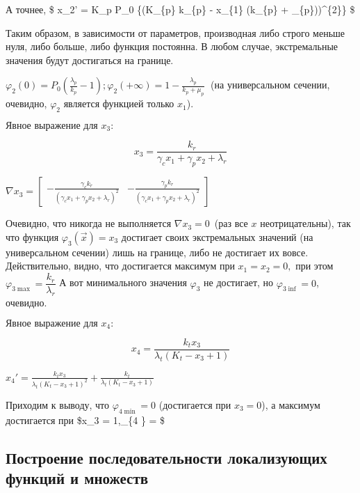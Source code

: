 \documentclass[11pt]{article}
\begin{document}
    
    А точнее, \$ x\_2' = K\_p P\_0
 \{\left(K\_\{p\}
k\_\{p\} - x\_\{1\} \left(k\_\{p\} + \mu\_\{p\}\right)\right)\^{}\{2\}\}
\$

Таким образом, в зависимости от параметров, производная либо строго
меньше нуля, либо больше, либо функция постоянна. В любом случае,
экстремальные значения будут достигаться на границе.

\(\varphi_2(0) = P_0 \left( \frac{\lambda_p}{k_p} - 1\right);  \varphi_2(+\!\infty) = 1 - \frac{\lambda_p}{k_p + \mu_p}\;\)
(на универсальном сечении, очевидно, \(\varphi_2\) является функцией
только \(x_1\)).

    $ \text{Явное выражение для } x_3: $

    
    $$ x_3 = \frac{k_{r}}{\gamma_{c} x_{1} + \gamma_{p} x_{2} + \lambda_{r}}$$

    
    $\nabla x_3 = \left[\begin{matrix}- \frac{\gamma_{c} k_{r}}{\left(\gamma_{c} x_{1} + \gamma_{p} x_{2} + \lambda_{r}\right)^{2}} & - \frac{\gamma_{p} k_{r}}{\left(\gamma_{c} x_{1} + \gamma_{p} x_{2} + \lambda_{r}\right)^{2}}\end{matrix}\right] $

    
    Очевидно, что никогда не выполняется \(\nabla x_3 = 0\,\) (раз все \(x\)
неотрицательны), так что функция \(\varphi_3(\vec{x}) = x_3\) достигает
своих экстремальных значений (на универсальном сечении) лишь на границе,
либо не достигает их вовсе. Действительно, видно, что достигается
максимум при \(x_1 = x_2 = 0,\) при этом
\(\varphi_{3 \max} = \dfrac{k_r}{\lambda_r}\) А вот минимального
значения \(\varphi_3\) не достигает, но \(\varphi_{3 \inf} = 0\),
очевидно.

    $ \text{Явное выражение для } x_4: $

    
    $$ x_4 = \frac{k_{t} x_{3}}{\lambda_{t} \left(K_{t} - x_{3} + 1\right)}$$

    
    $x_4' = \frac{k_{t} x_{3}}{\lambda_{t} \left(K_{t} - x_{3} + 1\right)^{2}} + \frac{k_{t}}{\lambda_{t} \left(K_{t} - x_{3} + 1\right)} $

    
    Приходим к выводу, что \(\varphi_{4 \min} = 0\) (достигается при
\(x_3 = 0\)), а максимум достигается при \$x\_3 = 1,\varphi\_\{4 \max\}
=  \$

    \hypertarget{ux43fux43eux441ux442ux440ux43eux435ux43dux438ux435-ux43fux43eux441ux43bux435ux434ux43eux432ux430ux442ux435ux43bux44cux43dux43eux441ux442ux438-ux43bux43eux43aux430ux43bux438ux437ux443ux44eux449ux438ux445-ux444ux443ux43dux43aux446ux438ux439-ux438-ux43cux43dux43eux436ux435ux441ux442ux432}{%
\subsection{Построение последовательности локализующих функций и
множеств}\label{ux43fux43eux441ux442ux440ux43eux435ux43dux438ux435-ux43fux43eux441ux43bux435ux434ux43eux432ux430ux442ux435ux43bux44cux43dux43eux441ux442ux438-ux43bux43eux43aux430ux43bux438ux437ux443ux44eux449ux438ux445-ux444ux443ux43dux43aux446ux438ux439-ux438-ux43cux43dux43eux436ux435ux441ux442ux432}}
\end{document}
